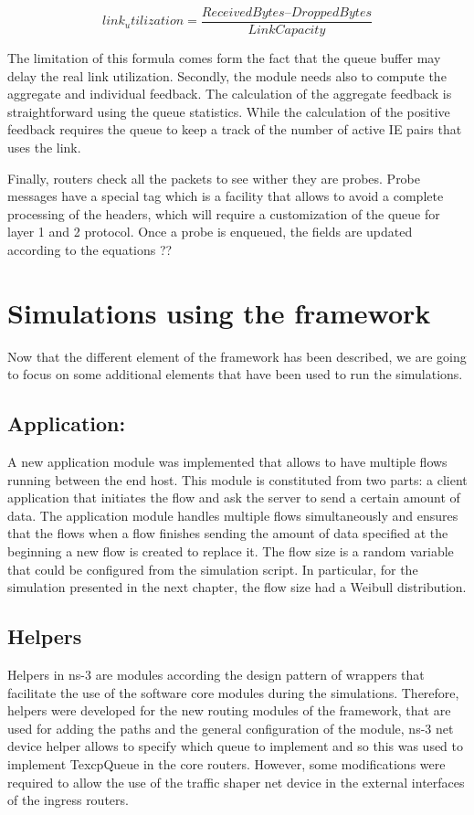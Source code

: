 \begin{equation}
link_utilization = \frac{ReceivedBytes – DroppedBytes}{LinkCapacity}
\end{equation}

The limitation of this formula comes form the fact that the queue buffer may delay the real link utilization.
Secondly, the module needs also to compute the aggregate and individual feedback. The calculation of the aggregate feedback is straightforward using the queue statistics. While the calculation of the positive feedback requires the queue to keep a track of the number of active IE pairs that uses the link.

Finally, routers check all the packets to see wither they are probes. Probe messages have a special tag which is a facility that allows to avoid a complete processing  of the headers, which will require a customization of the queue for layer 1 and 2 protocol. Once a probe is enqueued, the fields are updated according to the equations ??

\section{Simulations using the framework}
Now that the different element of the framework has been described, we are going to focus on some additional elements that have been used to run the simulations.

\subsection{Application: }
A new application module was implemented that allows to have multiple flows running between the end host. This module is constituted from two parts: a client application that initiates the flow and ask the server to send a certain amount of data. The application module handles multiple flows simultaneously and ensures that the flows when a flow finishes sending the amount of data specified at the beginning a new flow is created to replace it. The flow size is a random variable that could  be configured from the simulation script. In particular, for the simulation presented in the next chapter, the flow size had  a Weibull distribution.

\subsection{Helpers}
Helpers in ns-3 are modules according the design pattern of wrappers that facilitate the use of the software core modules during the simulations. Therefore, helpers were developed for the new routing modules of the framework, that are used for adding the paths and the general configuration of the module, ns-3 net device helper allows to specify which queue to implement and so this was used to implement TexcpQueue in the core routers. However, some modifications were required to allow the use of the traffic shaper net device in the external interfaces of the ingress routers. 

